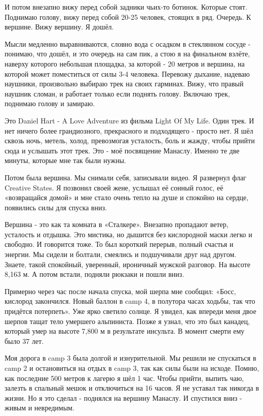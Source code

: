 И потом внезапно вижу перед собой задники чьих-то ботинок. Которые стоят.
Поднимаю голову, вижу перед собой 20-25 человек, стоящих в ряд. Очередь. К
вершине. Вижу вершину. Я дошёл. 

Мысли медленно выравниваются, словно вода с осадком в стеклянном сосуде -
понимаю, что дошёл, и это очередь на сам пик, а стою я на финальном взлёте,
наверху которого небольшая площадка, за которой - 20 метров и вершина, на
которой может поместиться от силы 3-4 человека. Перевожу дыхание, надеваю
наушники, произвольно выбираю трек на своих гарминах. Вижу, что правый наушник
сломан, и работает только если поднять голову. Включаю трек, поднимаю голову и
замираю. 

Это Daniel Hart - A Love Adventure из фильма Light Of My Life. Один трек. И нет
ничего более грандиозного, прекрасного и подходящего - просто нет. Я шёл сквозь
ночь, метель, холод, превозмогая усталость, боль и жажду, чтобы прийти сюда и
услышать этот трек. Это - моё посвящение Манаслу. Именно те две минуты, которые
мне так были нужны. 

Потом была вершина. Мы снимали себя, записывали видео. Я развернул флаг
Creative States. Я позвонил своей жене, услышал её сонный голос, её
«возвращайся домой» и мне стало очень тепло на душе и спокойно на сердце,
появились силы для спуска вниз. 

Вершина - это как та комната в «Сталкере». Внезапно пропадают ветер, усталость
и отдышка. Это мистика, но дышится без кислородной маски легко и свободно. И
говорится тоже. То был короткий перерыв, полный счастья и энергии. Мы сидели и
болтали, смеялись и подшучивали друг над другом. Знаете, такой спокойный,
уверенный, ироничный мужской разговор. На высоте 8,163 м. А потом встали,
подняли рюкзаки и пошли вниз. 

Примерно через час после начала спуска, мой шерпа мне сообщил: «Босс, кислород
закончился. Новый баллон в camp 4, в полутора часах ходьбы, так что придётся
потерпеть». Уже ярко светило солнце. Я увидел, как впереди меня двое шерпов
тащат тело умершего альпиниста. Позже я узнал, что это был канадец, который
умер на высоте 7,800 м в результате инсульта. В момент смерти ему было 37 лет. 

Моя дорога в camp 3 была долгой и изнурительной. Мы решили не спускаться в camp
2 и остановиться на отдых в camp 3, так как силы были на исходе. Помню, как
последние 500 метров к лагерю я шёл 1 час. Чтобы прийти, выпить чаю, залезть в
спальный мешок и отключиться на 16 часов. Я не уставал так никогда в жизни. Но
я это сделал - поднялся на вершину Манаслу. И спустился вниз - живым и
невредимым. 

